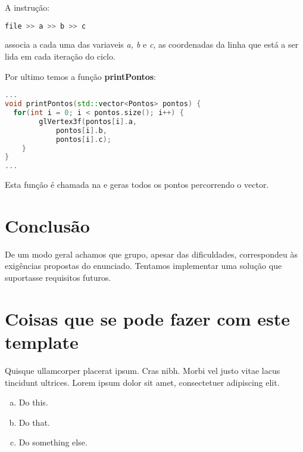 \documentclass{article}
\begin{document}
\begin{info} %
	A instrução:
	\begin{lstlisting}[language=C++]
		file >> a >> b >> c
	\end{lstlisting}
	associa a cada uma das variaveis \textit{a, b} e \textit{c}, as coordenadas da linha que está a ser lida em cada iteração do ciclo.
\end{info}

Por ultimo temos a função \textbf{printPontos}:

\begin{file}
	\begin{lstlisting}[language=C++]
...
void printPontos(std::vector<Pontos> pontos) {
  for(int i = 0; i < pontos.size(); i++) {
		glVertex3f(pontos[i].a,
			pontos[i].b, 
			pontos[i].c);
	}
}
...
	\end{lstlisting}
\end{file}

Esta função é chamada na  e geras todos os pontos percorrendo o vector.


\section{Conclusão}
De um modo geral achamos que grupo, apesar das dificuldades,  correspondeu às exigências propostas do enunciado. Tentamos implementar uma solução que suportasse requisitos futuros.  
\appendix

\section{Coisas que se pode fazer com este template}

\begin{question}
	Quisque ullamcorper placerat ipsum. Cras nibh. Morbi vel justo vitae lacus tincidunt ultrices. Lorem ipsum dolor sit amet, consectetuer adipiscing elit.

	\begin{enumerate}[(a)]
		\item Do this.
		\item Do that.
		\item Do something else.
	\end{enumerate}
\end{question}
	
\end{document}
